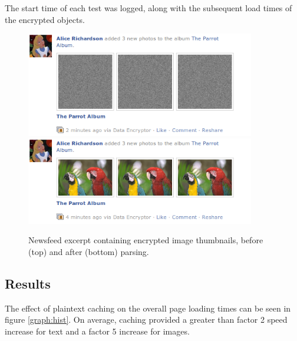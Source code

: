 The start time of each test was logged, along with the subsequent load times of the encrypted objects. 

    \begin{figure}[tbph]
        \begin{center}
                \includegraphics[width=10cm]{screens/parrots1.png}
                \includegraphics[width=10cm]{screens/parrots2.png}
            \caption{Newsfeed excerpt containing encrypted image thumbnails, before (top) and after (bottom) parsing.}
            \label{scn:parrots}
        \end{center}
    \end{figure}


\subsection{Results}

The effect of plaintext caching on the overall page loading times can be seen in figure \ref{graph:hist}. On average, caching provided a greater than factor 2 speed increase for text and a factor 5 increase for images.

